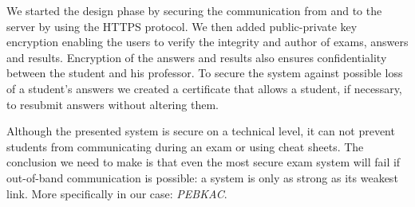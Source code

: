 \documentclass[12pt]{article}
\begin{document}
We started the design phase by securing the communication from and to the server
by using the HTTPS protocol. We then added public-private key encryption
enabling the users to verify the integrity and author of exams, answers and
results. Encryption of the answers and results also ensures confidentiality
between the student and his professor. To secure the system against possible
loss of a student's answers we created a certificate that allows a student, if
necessary, to resubmit answers without altering them.

Although the presented system is secure on a technical level, it can not prevent
students from communicating during an exam or using cheat sheets. The conclusion
we need to make is that even the most secure exam system will fail if
out-of-band communication is possible: a system is only as strong as its weakest link.
More specifically in our case: \emph{PEBKAC}\footnotemark{}.

\end{document}

